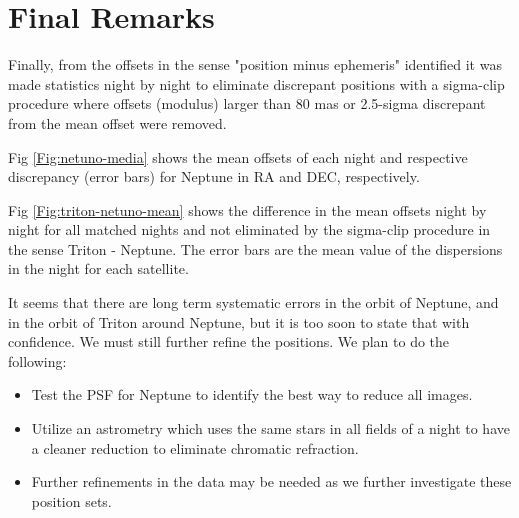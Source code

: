 \documentclass[12pt,a4paper]{report}
\newcommand{\PE}{Perkin-Elmer }
\newcommand{\BC}{Boller \& Chivens }
\begin{document}
\section*{Final Remarks}

Finally, from the offsets in the sense "position minus ephemeris" identified it was made statistics night by night to eliminate discrepant positions with a sigma-clip procedure where offsets (modulus) larger than 80 mas or 2.5-sigma discrepant from the mean offset were removed.%

Fig \ref{Fig:netuno-media} shows the mean offsets of each night and respective discrepancy (error bars) for Neptune in RA and DEC, respectively.

Fig \ref{Fig:triton-netuno-mean} shows the difference in the mean offsets night by night for all matched nights and not eliminated by the sigma-clip procedure in the sense Triton - Neptune. The error bars are the mean value of the dispersions in the night for each satellite.



It seems that there are long term systematic errors in the orbit of Neptune, and in the orbit of Triton around Neptune, but it is too soon to state that with confidence. We must still further refine the positions. We plan to do the following:

\begin{itemize}
\item Test the PSF for Neptune to identify the best way to reduce all images.
\item Utilize an astrometry which uses the same stars in all fields of a night to have a cleaner reduction to eliminate chromatic refraction.
\item Further refinements in the data may be needed as we further investigate these position sets.
\end{itemize}

\end{document}

